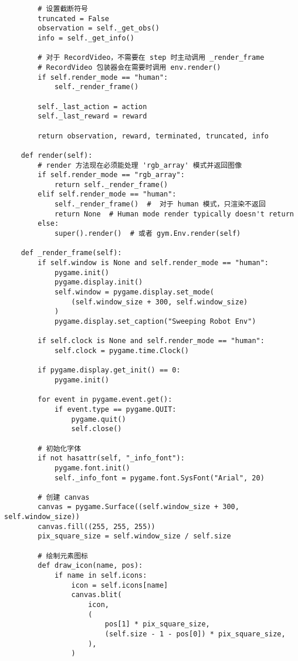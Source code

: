 \begin{verbatim}
        # 设置截断符号
        truncated = False
        observation = self._get_obs()
        info = self._get_info()

        # 对于 RecordVideo，不需要在 step 时主动调用 _render_frame
        # RecordVideo 包装器会在需要时调用 env.render()
        if self.render_mode == "human":
            self._render_frame()

        self._last_action = action
        self._last_reward = reward

        return observation, reward, terminated, truncated, info

    def render(self):
        # render 方法现在必须能处理 'rgb_array' 模式并返回图像
        if self.render_mode == "rgb_array":
            return self._render_frame()
        elif self.render_mode == "human":
            self._render_frame()  #  对于 human 模式，只渲染不返回
            return None  # Human mode render typically doesn't return
        else:
            super().render()  # 或者 gym.Env.render(self)

    def _render_frame(self):
        if self.window is None and self.render_mode == "human":
            pygame.init()
            pygame.display.init()
            self.window = pygame.display.set_mode(
                (self.window_size + 300, self.window_size)
            )
            pygame.display.set_caption("Sweeping Robot Env")

        if self.clock is None and self.render_mode == "human":
            self.clock = pygame.time.Clock()

        if pygame.display.get_init() == 0:
            pygame.init()

        for event in pygame.event.get():
            if event.type == pygame.QUIT:
                pygame.quit()
                self.close()

        # 初始化字体
        if not hasattr(self, "_info_font"):
            pygame.font.init()
            self._info_font = pygame.font.SysFont("Arial", 20)

        # 创建 canvas
        canvas = pygame.Surface((self.window_size + 300, self.window_size))
        canvas.fill((255, 255, 255))
        pix_square_size = self.window_size / self.size

        # 绘制元素图标
        def draw_icon(name, pos):
            if name in self.icons:
                icon = self.icons[name]
                canvas.blit(
                    icon,
                    (
                        pos[1] * pix_square_size,
                        (self.size - 1 - pos[0]) * pix_square_size,
                    ),
                )


\end{verbatim}
